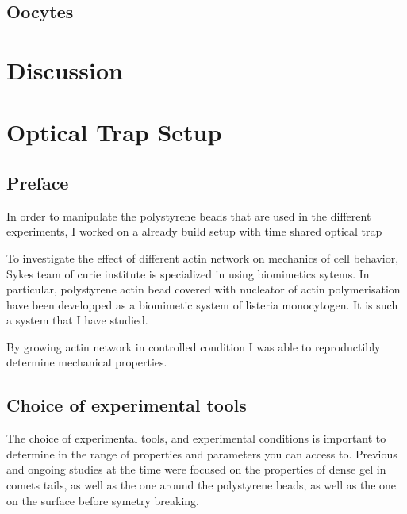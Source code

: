\documentclass[A4paperpaper,11pt,english]{sphinxmanual}
\begin{document}
\section{Oocytes}
\label{parts/part3:oocytes}

\chapter{Discussion}
\label{parts/part4:discussion}\label{parts/part4::doc}

\chapter{Optical Trap Setup}
\label{parts/physicalparameters:physicalparameters}\label{parts/physicalparameters::doc}\label{parts/physicalparameters:optical-trap-setup}

\section{Preface}
\label{parts/physicalparameters:preface}
In order to manipulate the polystyrene beads that are used in the different
experiments, I worked on a already build setup with time shared optical trap

To investigate the effect of different actin network on mechanics of cell
behavior, Sykes team of curie institute is specialized in using biomimetics
sytems. In particular, polystyrene actin bead covered with nucleator of actin
polymerisation have been developped as a biomimetic system of listeria
monocytogen. It is such a system that I have studied.

By growing actin network in controlled condition I was able to reproductibly
determine mechanical properties.


\section{Choice of experimental tools}
\label{parts/physicalparameters:choice-of-experimental-tools}
The choice of experimental tools, and experimental conditions is important to
determine in the range of properties and parameters you can access to.
Previous and ongoing studies at the time were focused on the properties of dense
gel in comets tails, as well as the one around the polystyrene beads, as well as the one on the surface before symetry breaking.
\end{document}
